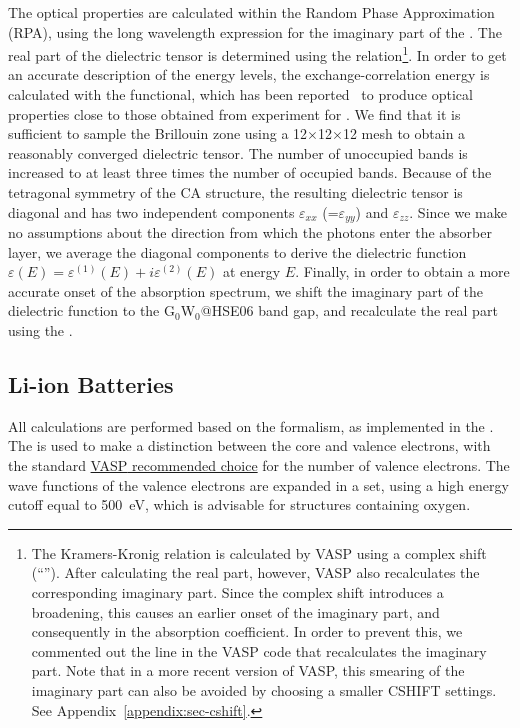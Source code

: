 \begin{refsection}
The optical properties are calculated within the Random Phase Approximation 
(RPA), using the long wavelength expression for the imaginary part of the 
. The real part of the dielectric 
tensor is determined using the  relation\footnote{The 
Kramers-Kronig relation is calculated by \gls{VASP} using a complex shift 
(``''). After calculating the real part, however, \gls{VASP} also 
recalculates the corresponding imaginary part. Since the complex shift 
introduces a broadening, this causes an earlier onset of the imaginary part, 
and consequently in the absorption coefficient. In order to prevent this, we 
commented out the line in the \gls{VASP} code that recalculates the imaginary 
part. Note that in a more recent version of \gls{VASP}, this smearing of the 
imaginary part can also be avoided by choosing a smaller CSHIFT settings. 
See Appendix~\ref{appendix:sec-cshift}.}. In order to get an accurate 
description of the energy levels, the 
exchange-correlation energy is calculated with the  functional, 
which has been reported~\cite{Wan2013} to produce optical properties close 
to those obtained from experiment for . We find that 
it is sufficient to sample the Brillouin zone using a 12$\times$12$\times$12 
 mesh to obtain a reasonably converged dielectric tensor. The number 
of unoccupied bands is increased to at least three times the number of 
occupied bands. Because of the tetragonal symmetry of the \gls{CA} structure, the 
resulting dielectric tensor is 
diagonal and has two independent components $\varepsilon_{xx}$ 
(=$\varepsilon_{yy}$) and $\varepsilon_{zz}$. Since we make no assumptions 
about the direction from which the photons enter the absorber layer, we 
average the diagonal components to derive the dielectric function $\varepsilon 
(E) = \varepsilon^{(1)} (E) + i \varepsilon^{(2)} (E) $ at energy $E$. 
Finally, in order to obtain a more accurate onset of the absorption spectrum, 
we shift the imaginary part of the dielectric function to the G$_0$W$_0$@HSE06 
band gap, and recalculate the real part using the 
.  
 
\subsection{Li-ion Batteries} 

All calculations are performed based on the  formalism, as 
implemented in the . The  is used to make a 
distinction between the core and valence electrons, with the standard 
\href{https://cms.mpi.univie.ac.at/vasp/vasp/Recommended_PAW_potentials_DFT_calculations_using_vasp_5_2.html}{\gls{VASP} recommended choice} for the 
number of valence electrons. The wave functions of the valence electrons are 
expanded in a  set, using a high energy cutoff equal to 
500~\si{\electronvolt}, which is advisable for structures containing oxygen. 


\end{refsection}
